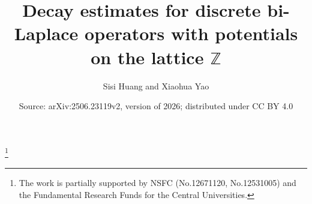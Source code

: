 \documentclass[10pt,a4paper]{amsart}
\newcommand\Z{\mathbb{Z}}
\numberwithin{equation}{section}
\begin{document}
\title[Decay estimates for discrete bi-Laplace operators with potentials]{Decay estimates for discrete bi-Laplace operators with potentials on the lattice $\Z$}
\author{Sisi Huang and Xiaohua Yao}
\address{Sisi Huang, Department of Mathematics, Central China Normal University, Wuhan, 430079, P.R. China}
\address{Xiaohua Yao, Department of Mathematics, Key Laboratory of Nonlinear Analysis and Applications (Ministry of Education), and Hubei Key Laboratory of Mathematical Sciences, Central China Normal University, Wuhan, 430079, P.R. China}
\thanks{The work is partially supported by NSFC (No.12671120, No.12531005) and the Fundamental Research Funds for the Central Universities.}
\date{Source: arXiv:2506.23119v2, version of 2026; distributed under CC BY 4.0}
\end{document}
